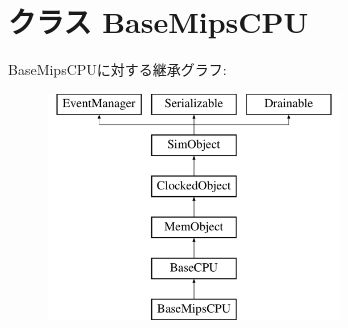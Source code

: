 \hypertarget{classMipsCPU_1_1BaseMipsCPU}{
\section{クラス BaseMipsCPU}
\label{classMipsCPU_1_1BaseMipsCPU}
}
BaseMipsCPUに対する継承グラフ:\begin{figure}[H]
\begin{center}
\leavevmode
\includegraphics[height=6cm]{classMipsCPU_1_1BaseMipsCPU}
\end{center}
\end{figure}
